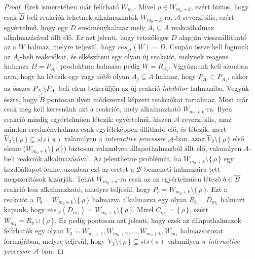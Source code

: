 \documentclass[12pt]{article}
\theoremstyle{definition}
\theoremstyle{remark}
\theoremstyle{plain}
\theoremstyle{remark}
\theoremstyle{plain}
\newcommand{\backwardhat}{\overset{\leftharpoonup}}
\newcommand{\res}{\textit{res}}
\begin{document}
\begin{proof}
            
        Ezek ismeretében már felírható $W_{m_{1}}$. Mivel $\rho \in W_{m_{0} + k}$, ezért biztos, hogy csak $\backwardhat B$-beli reakciók lehetnek alkalmazhatók $W_{m_{0} + k}$-ra. $\mathscr{A}$ reverzibilis, ezért egyértelmű, hogy egy $D$ eredményhalmaz mely $A_{i} \subseteq A$ reakcióhalmaz alkalmazásával állt elő. Ez azt jelenti, hogy tetszőleges $D$ alapján visszaállítható az a $W$ halmaz, melyre teljesül, hogy $\res_{\mathscr{A}}(W)=D$. Csupán össze kell fognunk az $A_{i}$-beli reakciókat, és elkészíteni egy olyan új reakciót, melynek reagens halmaza $D = P_{A_{i}}$, produktum halmaza pedig $W = R_{A_{i}}$. Vigyáznunk kell azonban arra, hogy ha létezik egy vagy több olyan $A_{j} \subseteq A$ halmaz, hogy $P_{A_{i}} \subset P_{A_{j}}$, akkor az összes $P_{A_{j}} \setminus P_{A_{i}}$-beli elem bekerüljön az új reakció \textit{inhibitor} halmazába. Vegyük észre, hogy $\backwardhat B$ pontosan ilyen módszerrel képzett reakciókat tartalmaz. Most már csak meg kell keresnünk azt a reakciót, mely alkalmazható $W_{m_{0} + k}$-ra. Ilyen reakció mindig egyértelműen létezik: egyértelmű, hiszen $\mathscr{A}$ reverzibilis, azaz minden eredményhalmaz csak egyféleképpen állítható elő, és létezik, mert $\backwardhat V_{2} \setminus \{ \, \rho \, \} \subseteq \textit{sts}(\pi)$ valamilyen $\pi$ \textit{interactive processre} $\mathscr{A}$-ban, azaz $\backwardhat V_{2} \setminus \{\,\rho\,\}$ első eleme ($W_{m_{0} + k} \setminus \{\,\rho\,\}$) biztosan valamilyen állapothalmazból állt elő, valamilyen $A$-beli reakciók alkalmazásával. Az jelenthetne problémát, ha $W_{m_{0} + k} \setminus \{\,\rho\,\}$ egy kezdőállapot lenne, azonban ezt az esetet a $\mathscr{B}$ bemeneti halmazaira tett megszorítások kizárják. %
        Tehát $W_{m_{0} + k}$-ra csak az az egyértelműen létező $b \in \backwardhat B$ reakció lesz alkalmazható, amelyre teljesül, hogy $P_{b} = W_{m_{0} + k} \setminus \{ \,  \rho \, \}$.  Ezt a reakciót a $P_{b} = W_{m_{0} + k} \setminus \{ \,  \rho \, \}$ halmazva alkalmazva egy olyan $R_{b} = D_{m_{1}}$ halmazt kapunk, hogy $\res_{\mathscr{A}}(D_{m_{1}}) = W_{m_{0} + k} \setminus \{ \,  \rho \, \}$. Mivel $C_{m_{1}} = \{\,\rho\,\}$, ezért $W_{m_{1}} = R_{b} \cup \{ \, \rho \, \}$. Ez pedig pontosan azt jelenti, hogy ezek az állapothalmazok felírhatók egy olyan $V_{3} = W_{m_{0} + 1}, W_{m_{0} + 2}, \ldots, W_{m_{0} + k}, W_{m_{1}}$ halmazsorozat formájában, melyre teljesül, hogy $\backwardhat V_{3} \setminus \{ \,  \rho \, \} \subseteq \textit{sts}(\pi)$ valamilyen $\pi$ \textit{interactive processre} $\mathscr{A}$-ban.


\end{proof}
\end{document}
